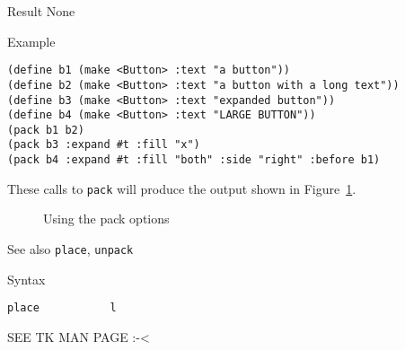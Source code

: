 \begin{schemedoc}{Result}
None
\end{schemedoc}

\begin{schemedoc}{Example}
\begin{verbatim}
(define b1 (make <Button> :text "a button"))
(define b2 (make <Button> :text "a button with a long text"))
(define b3 (make <Button> :text "expanded button"))
(define b4 (make <Button> :text "LARGE BUTTON")) 
(pack b1 b2)
(pack b3 :expand #t :fill "x")
(pack b4 :expand #t :fill "both" :side "right" :before b1)
\end{verbatim}
These calls to {\tt pack} will produce the output shown in
Figure~\ref{pack-options}.
\end{schemedoc}
\begin{figure}
\centerline{}
\caption{Using the pack options}
\label{pack-options}
\end{figure}

\begin{schemedoc}{See also}
{\tt place}, {\tt unpack}
\end{schemedoc}

%
%


\begin{schemedoc}{Syntax}
\begin{verbatim}
place           l
\end{verbatim}
\end{schemedoc}

SEE TK MAN PAGE :-<

% 
% 
% 
% 
% 
% 
% 
% 
% 
% 
% 


